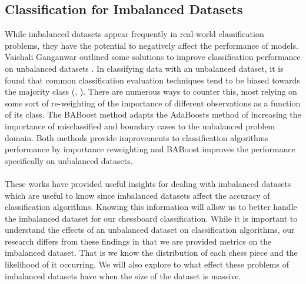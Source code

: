 \documentclass{article}
\begin{document}
\begin{multicols}{2}
\subsection{Classification for Imbalanced Datasets}
While imbalanced datasets appear frequently in real-world classification problems, they have the potential to negatively affect the performance of models\cite{PWork2}. Vaishali Ganganwar outlined some solutions to improve classification performance on unbalanced datasets \cite{PWork2}.
In classifying data with an unbalanced dataset, it is found that common classification evaluation techniques tend to be biased towards the majority class (\cite{BABoost}, \cite{PWork2}).
There are numerous ways to counter this, most relying on some sort of re-weighting of the importance of different observations as a function of its class\cite{PWork2}.
The BABoost method\cite{BABoost} adapts the AdaBoosts \cite{ADABoost} method of increasing the importance of misclassified and boundary cases to the unbalanced problem domain\cite{BABoost}.
Both methods provide improvements to classification algorithms performance by importance reweighting and BABoost improves the performance specifically on unbalanced datasets.
\\\\
These works have provided useful insights for dealing with imbalanced datasets which are useful to know since imbalanced datasets affect the accuracy of classification algorithms. Knowing this information will allow us to better handle the imbalanced dataset for our chessboard classification. While it is important to understand the effects of an unbalanced dataset on classification algorithms, our research differs from these findings in that we are provided metrics on the imbalanced dataset. That is we know the distribution of each chess piece and the likelihood of it occurring. 
We will also explore to what effect these problems of imbalanced datasets have when the size of the dataset is massive.



\end{multicols}
\end{document}
